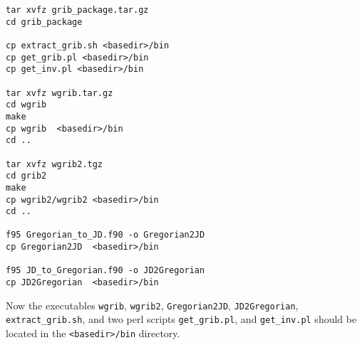 \begin{verbatim}
tar xvfz grib_package.tar.gz
cd grib_package

cp extract_grib.sh <basedir>/bin
cp get_grib.pl <basedir>/bin
cp get_inv.pl <basedir>/bin

tar xvfz wgrib.tar.gz
cd wgrib
make
cp wgrib  <basedir>/bin
cd ..

tar xvfz wgrib2.tgz
cd grib2
make
cp wgrib2/wgrib2 <basedir>/bin
cd ..

f95 Gregorian_to_JD.f90 -o Gregorian2JD
cp Gregorian2JD  <basedir>/bin

f95 JD_to_Gregorian.f90 -o JD2Gregorian
cp JD2Gregorian  <basedir>/bin
\end{verbatim}
Now the executables {\tt wgrib}, {\tt wgrib2}, {\tt Gregorian2JD},
{\tt JD2Gregorian},  {\tt extract\_grib.sh}, and two perl scripts
{\tt get\_grib.pl}, and {\tt get\_inv.pl} should be located in the
{\tt <basedir>/bin} directory.
